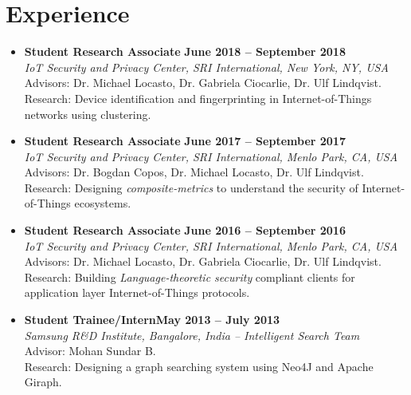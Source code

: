 \documentclass[letterpaper,10pt]{article}
\begin{document}
\section*{\color{dartmouthgreen} Experience}
\begin{itemize}
  \setlength\itemsep{0ex}
  \item \textbf{Student Research Associate} \mbox{}\hfill\textbf{June 2018 -- September 2018}\\
  \textit{IoT Security and Privacy Center, SRI International, New York, NY, USA}\\
    Advisors: Dr. Michael Locasto, Dr. Gabriela Ciocarlie, Dr. Ulf Lindqvist.\\
    Research: Device identification and fingerprinting in Internet-of-Things networks using clustering.
  
  \item \textbf{Student Research Associate} \mbox{}\hfill\textbf{June 2017 -- September 2017}\\
  \textit{IoT Security and Privacy Center, SRI International, Menlo Park, CA, USA}\\
    Advisors: Dr. Bogdan Copos, Dr. Michael Locasto, Dr. Ulf Lindqvist.\\
    Research: Designing \textit{composite-metrics} to understand the security of Internet-of-Things ecosystems.

  \item \textbf{Student Research Associate} \mbox{}\hfill\textbf{June 2016 -- September 2016}\\
  \textit{IoT Security and Privacy Center, SRI International, Menlo Park, CA, USA}\\
    Advisors: Dr. Michael Locasto, Dr. Gabriela Ciocarlie, Dr. Ulf Lindqvist.\\
    Research: Building \textit{Language-theoretic security} compliant clients for application layer Internet-of-Things protocols.

    \item \textbf{Student Trainee/Intern}\mbox{}\hfill\textbf{May 2013 -- July 2013}\\
  \textit{Samsung R\&D Institute, Bangalore, India -- Intelligent Search Team}\\
    Advisor: Mohan Sundar B.\\
    Research: Designing a graph searching system using Neo4J and Apache Giraph.
\end{itemize}
\end{document}
